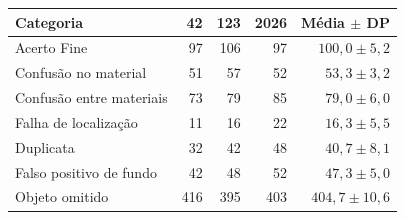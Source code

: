 \begin{tabular}{lrrrr}
\toprule
Categoria & 42 & 123 & 2026 & Média $\pm$ DP \\
\midrule
Acerto Fine & 97 & 106 & 97 & $100{,}0\pm5{,}2$ \\
Confusão no material & 51 & 57 & 52 & $53{,}3\pm3{,}2$ \\
Confusão entre materiais & 73 & 79 & 85 & $79{,}0\pm6{,}0$ \\
Falha de localização & 11 & 16 & 22 & $16{,}3\pm5{,}5$ \\
Duplicata & 32 & 42 & 48 & $40{,}7\pm8{,}1$ \\
Falso positivo de fundo & 42 & 48 & 52 & $47{,}3\pm5{,}0$ \\
Objeto omitido & 416 & 395 & 403 & $404{,}7\pm10{,}6$ \\
\bottomrule
\end{tabular}
